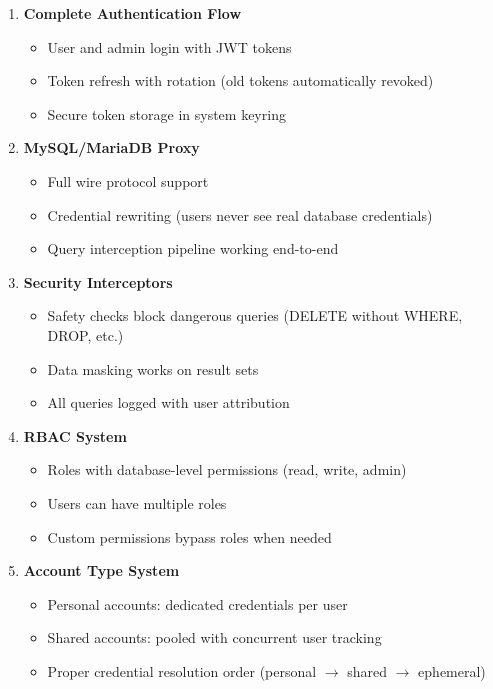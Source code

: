 \begin{enumerate}
    \item \textbf{Complete Authentication Flow}
    \begin{itemize}
        \item User and admin login with JWT tokens
        \item Token refresh with rotation (old tokens automatically revoked)
        \item Secure token storage in system keyring
    \end{itemize}
    
    \item \textbf{MySQL/MariaDB Proxy}
    \begin{itemize}
        \item Full wire protocol support
        \item Credential rewriting (users never see real database credentials)
        \item Query interception pipeline working end-to-end
    \end{itemize}
    
    \item \textbf{Security Interceptors}
    \begin{itemize}
        \item Safety checks block dangerous queries (DELETE without WHERE, DROP, etc.)
        \item Data masking works on result sets
        \item All queries logged with user attribution
    \end{itemize}
    
    \item \textbf{RBAC System}
    \begin{itemize}
        \item Roles with database-level permissions (read, write, admin)
        \item Users can have multiple roles
        \item Custom permissions bypass roles when needed
    \end{itemize}
    
    \item \textbf{Account Type System}
    \begin{itemize}
        \item Personal accounts: dedicated credentials per user
        \item Shared accounts: pooled with concurrent user tracking
        \item Proper credential resolution order (personal $\rightarrow$ shared $\rightarrow$ ephemeral)
    \end{itemize}
    

\end{enumerate}

